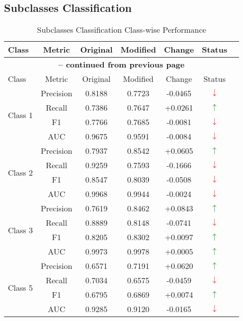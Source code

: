 \documentclass[12pt,a4paper]{article}
\begin{document}
\subsection{Subclasses Classification}
\begin{longtable}{lcccccc}
\caption{Subclasses Classification Class-wise Performance}
\label{tab:subclass_metrics} \\
\toprule
Class & Metric & Original & Modified & Change & Status \\
\midrule
\endfirsthead
\multicolumn{6}{c}{{\bfseries \tablename\ \thetable{} -- continued from previous page}} \\
\toprule
Class & Metric & Original & Modified & Change & Status \\
\midrule
\endhead
\multirow{4}{*}{Class 1} & Precision & 0.8188 & 0.7723 & -0.0465 & \textcolor{red}{$\downarrow$} \\
 & Recall & 0.7386 & 0.7647 & +0.0261 & \textcolor{green}{$\uparrow$} \\
 & F1 & 0.7766 & 0.7685 & -0.0081 & \textcolor{red}{$\downarrow$} \\
 & AUC & 0.9675 & 0.9591 & -0.0084 & \textcolor{red}{$\downarrow$} \\
\midrule
\multirow{4}{*}{Class 2} & Precision & 0.7937 & 0.8542 & +0.0605 & \textcolor{green}{$\uparrow$} \\
 & Recall & 0.9259 & 0.7593 & -0.1666 & \textcolor{red}{$\downarrow$} \\
 & F1 & 0.8547 & 0.8039 & -0.0508 & \textcolor{red}{$\downarrow$} \\
 & AUC & 0.9968 & 0.9944 & -0.0024 & \textcolor{red}{$\downarrow$} \\
\midrule
\multirow{4}{*}{Class 3} & Precision & 0.7619 & 0.8462 & +0.0843 & \textcolor{green}{$\uparrow$} \\
 & Recall & 0.8889 & 0.8148 & -0.0741 & \textcolor{red}{$\downarrow$} \\
 & F1 & 0.8205 & 0.8302 & +0.0097 & \textcolor{green}{$\uparrow$} \\
 & AUC & 0.9973 & 0.9978 & +0.0005 & \textcolor{green}{$\uparrow$} \\
\midrule
\multirow{4}{*}{Class 5} & Precision & 0.6571 & 0.7191 & +0.0620 & \textcolor{green}{$\uparrow$} \\
 & Recall & 0.7034 & 0.6575 & -0.0459 & \textcolor{red}{$\downarrow$} \\
 & F1 & 0.6795 & 0.6869 & +0.0074 & \textcolor{green}{$\uparrow$} \\
 & AUC & 0.9285 & 0.9120 & -0.0165 & \textcolor{red}{$\downarrow$} \\

\end{longtable}
\end{document}

